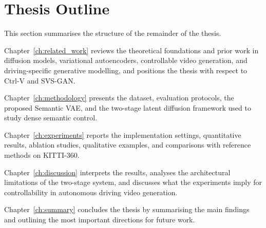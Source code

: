 \section{Thesis Outline}
\label{sec:outline}

This section summarises the structure of the remainder of the thesis.

Chapter~\ref{ch:related_work} reviews the theoretical foundations and prior work in diffusion models, variational autoencoders, controllable video generation, and driving-specific generative modelling, and positions the thesis with respect to Ctrl-V and SVS-GAN.

Chapter~\ref{ch:methodology} presents the dataset, evaluation protocols, the proposed Semantic VAE, and the two-stage latent diffusion framework used to study dense semantic control.

Chapter~\ref{ch:experiments} reports the implementation settings, quantitative results, ablation studies, qualitative examples, and comparisons with reference methods on KITTI-360.

Chapter~\ref{ch:discussion} interprets the results, analyses the architectural limitations of the two-stage system, and discusses what the experiments imply for controllability in autonomous driving video generation.

Chapter~\ref{ch:summary} concludes the thesis by summarising the main findings and outlining the most important directions for future work.
